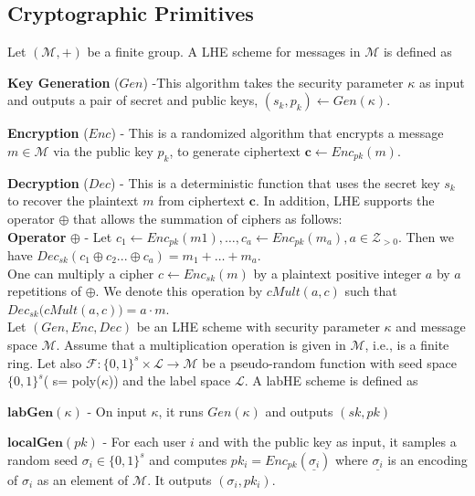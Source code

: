 \subsection{Cryptographic Primitives}
Let $(\mathcal{M}, +)$ be a finite group. A \textsf{LHE} scheme
for messages in $\mathcal{M}$ is defined  as \squishlist
\item \textbf{Key Generation }($Gen$) -This  algorithm takes the security parameter $\kappa$ as input and outputs
a pair of secret and public keys, $(s_k, p_k) \leftarrow Gen(\kappa)$.
\item \textbf{Encryption} ($Enc$) - This is a randomized algorithm that encrypts a message $m \in \mathcal{M}$ via the public key $p_k$, to generate ciphertext $\mathbf{c} \leftarrow Enc_{pk}(m)$.
\item \textbf{Decryption} ($Dec$) - This is a deterministic function that uses the secret key $s_k$ to
recover the plaintext $m$ from ciphertext $\mathbf{c}$.
\squishend
In addition, \textsf{LHE} supports the operator $\oplus$ that allows the summation of ciphers as follows:
\\ \textbf{Operator} $\oplus$ - Let $c_1 \leftarrow Enc_{pk}(m1), \ldots, c_a \leftarrow Enc_{pk}(m_a), a \in \mathcal{Z}_{>0}$. Then we have  $Dec_{sk}(c_1\oplus c_2 ...\oplus c_a)=    m_1 + \ldots   + m_a$.  \\
One can multiply a cipher $c\leftarrow  Enc_{sk}(m)$ by a plaintext positive integer $a$ by $a$ repetitions of $\oplus$. We denote this operation by $cMult(a,c)$ such that $Dec_{sk}\big(cMult(a,c)\big)=a\cdot m$.\\
Let $(Gen,Enc,Dec)$ be an \textsf{LHE} scheme with security parameter $\kappa$ and message space $\mathcal{M}$. Assume that a multiplication operation is given in $\mathcal{M}$, i.e., is a finite ring. Let also $\mathcal{F}:\{0,1\}^s \times \mathcal{L}\rightarrow \mathcal{M}$ be a pseudo-random function with seed space $\{0,1\}^s$( s= poly($\kappa $)) and the label space $\mathcal{L}$. A \textsf{labHE} scheme is defined as
\squishlist
 \item $\textbf{labGen}(\kappa)$ - On input $\kappa$, it runs $Gen(\kappa)$ and outputs $(sk,pk)$
\item $\textbf{localGen}(pk)$ -  For each user $i$ and with the public key as input, it samples a random seed $\sigma_i \in \{0,1\}^s$ and computes $pk_i = Enc_{pk}(\underline{\sigma_i})$ where $\underline{\sigma_i}$ is an  encoding of $\sigma_i$ as an  element of $\mathcal{M}$. It outputs $(\sigma_i,pk_i)$.
